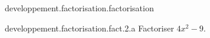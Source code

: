 \begin{qcm}{developpement.factorisation.factorisation}
  \begin{question}{developpement.factorisation.fact.2.a}
    Factoriser \(4x^2-9\).
    \vspace{-1.5ex}
    \begin{multicols}{2}
      \begin{reponses}
      \end{reponses}
    \end{multicols}
  \end{question}
\end{qcm}
